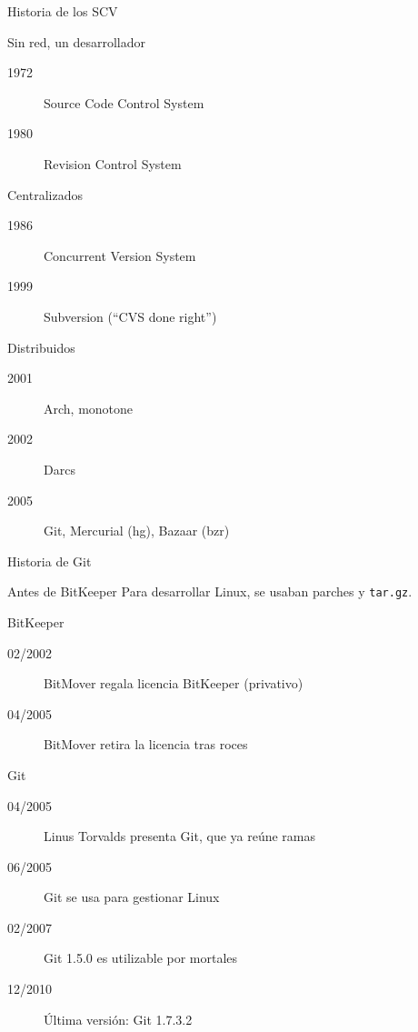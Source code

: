 \documentclass[compress,xcolor=svgnames]{beamer}
\begin{document}
\begin{frame}{Historia de los SCV}

  \begin{block}{Sin red, un desarrollador}
    \begin{description}
    \item[1972] Source Code Control System
    \item[1980] Revision Control System
    \end{description}
  \end{block}

  \begin{block}{Centralizados}
    \begin{description}
    \item[1986] Concurrent Version System
    \item[1999] Subversion (\enquote{CVS done right})
    \end{description}
  \end{block}

  \begin{block}{Distribuidos}
    \begin{description}
    \item[2001] Arch, monotone
    \item[2002] Darcs
    \item[2005] Git, Mercurial (hg), Bazaar (bzr)
    \end{description}
  \end{block}

\end{frame}

\begin{frame}{Historia de Git}

  \begin{block}{Antes de BitKeeper}
    Para desarrollar Linux, se usaban parches y \texttt{tar.gz}.
  \end{block}

  \begin{block}{BitKeeper}
    \begin{description}
    \item[02/2002] BitMover regala licencia BitKeeper (privativo)
    \item[04/2005] BitMover retira la licencia tras roces
    \end{description}
  \end{block}

  \begin{block}{Git}
    \begin{description}
    \item[04/2005] Linus Torvalds presenta Git, que ya reúne ramas
    \item[06/2005] Git se usa para gestionar Linux
    \item[02/2007] Git 1.5.0 es utilizable por mortales
    \item[12/2010] Última versión: Git 1.7.3.2
    \end{description}
  \end{block}

\end{frame}
\end{document}
